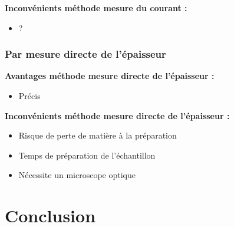\textbf{Inconvénients méthode mesure du courant :}
\begin{itemize}
    \item ?
\end{itemize}


\subsubsection{Par mesure directe de l'épaisseur}
\textbf{Avantages méthode mesure directe de l'épaisseur :}
\begin{itemize}
    \item Précis
\end{itemize}

\textbf{Inconvénients méthode mesure directe de l'épaisseur :}
\begin{itemize}
    \item Risque de perte de matière à la préparation
    \item Temps de préparation de l'échantillon
    \item Nécessite un microscope optique
\end{itemize}


\section{Conclusion}
